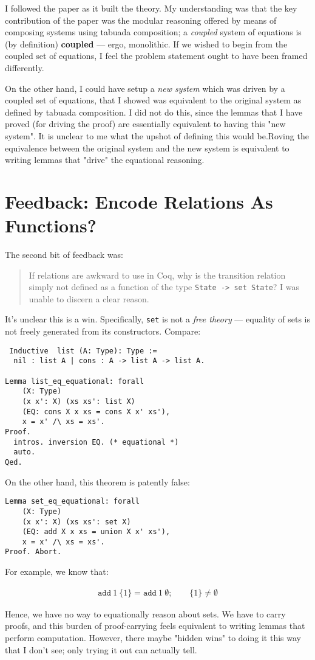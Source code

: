 \documentclass{article}
\begin{document}
I followed the paper as it built the theory. My understanding was that
the key contribution of the paper was the modular reasoning offered by means
of composing systems using tabuada composition; a \emph{coupled} system of equations
is (by definition) \textbf{coupled} ---  ergo, monolithic. If we wished to begin from the coupled set of equations, I feel the problem
statement ought to have been framed differently.

On the other hand, I could have setup a  \emph{new system} which was driven by
a coupled set of equations, that I showed was equivalent to the original system
as defined by tabuada composition. I did not do this, since the lemmas
that I have proved (for driving the proof) are essentially equivalent
to having this "new system". It is unclear to me what the upshot of defining
this would be.Roving the equivalence between the original system and the new
system is equivalent to writing lemmas that "drive" the equational reasoning.



\section{Feedback: Encode Relations As Functions?}
The second bit of feedback was:

\begin{quote}
If relations are awkward to use in Coq, why
is the transition relation simply not defined
as a function of the type \texttt{State -> set State}?
I was unable to discern a clear reason.
\end{quote}

It's unclear this is a win. Specifically, \texttt{set} 
is not a \emph{free theory} --- equality of sets is not
freely generated from its constructors. Compare:

\begin{verbatim}
 Inductive  list (A: Type): Type :=
  nil : list A | cons : A -> list A -> list A.

Lemma list_eq_equational: forall
    (X: Type)
    (x x': X) (xs xs': list X)
    (EQ: cons X x xs = cons X x' xs'),
    x = x' /\ xs = xs'.
Proof.
  intros. inversion EQ. (* equational *)
  auto.
Qed.
\end{verbatim}

On the other hand, this theorem is patently false:

\begin{verbatim}
Lemma set_eq_equational: forall
    (X: Type)
    (x x': X) (xs xs': set X)
    (EQ: add X x xs = union X x' xs'),
    x = x' /\ xs = xs'.
Proof. Abort.
\end{verbatim}

For example, we know that:

\begin{align*}
\texttt{add}~ 1~ \{ 1 \} = \texttt{add}~1 ~\emptyset; \qquad \{ 1 \} \neq \emptyset
\end{align*}

Hence, we have no way to equationally reason about sets. We have
to carry proofs, and this burden of proof-carrying feels
equivalent to writing lemmas that perform computation. However,
there maybe "hidden wins" to doing it this way that I don't see; only trying
it out can actually tell.
\end{document}

